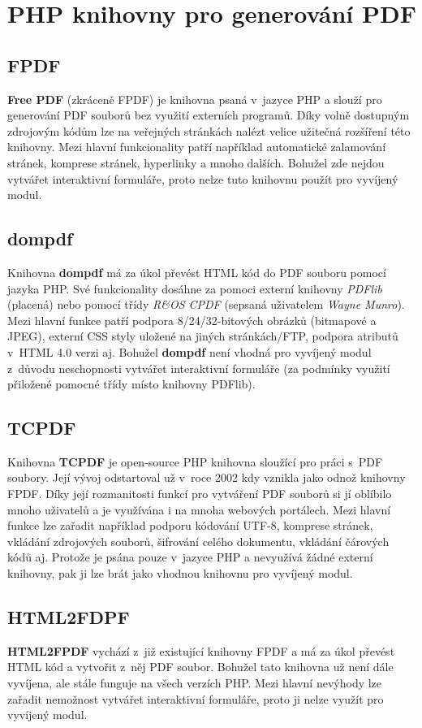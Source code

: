 \section{PHP knihovny pro generování PDF}
\subsection{FPDF}
\textbf{Free PDF} (zkráceně FPDF) je knihovna psaná v~jazyce PHP a slouží pro generování PDF souborů bez využití externích programů. Díky volně dostupným zdrojovým kódům lze na veřejných stránkách nalézt velice užitečná rozšíření této knihovny. Mezi hlavní funkcionality patří například automatické zalamování stránek, komprese stránek, hyperlinky a mnoho dalších. Bohužel zde nejdou vytvářet interaktivní formuláře, proto nelze tuto knihovnu použít pro vyvíjený modul.
\subsection{dompdf}
Knihovna \textbf{dompdf} má za úkol převést HTML kód do PDF souboru pomocí jazyka PHP. Své funkcionality dosáhne za pomoci externí knihovny \textit{PDFlib} (placená) nebo pomocí třídy \textit{R\&OS CPDF} (sepsaná uživatelem \textit{Wayne Munro}). Mezi hlavní funkce patří podpora 8/24/32-bitových obrázků (bitmapové a JPEG), externí CSS styly uložené na jiných stránkách/FTP, podpora atributů v~HTML 4.0 verzi aj. Bohužel \textbf{dompdf} není vhodná pro vyvíjený modul z~důvodu neschopnosti vytvářet interaktivní formuláře (za podmínky využití přiložené pomocné třídy místo knihovny PDFlib).
\subsection{TCPDF} \label{subsec:tcpdf}
Knihovna \textbf{TCPDF} je open-source PHP knihovna sloužící pro práci s~PDF soubory. Její vývoj odstartoval už v~roce 2002 kdy vznikla jako odnož knihovny FPDF. Díky její rozmanitosti funkcí pro vytváření PDF souborů si jí oblíbilo mnoho uživatelů a je využívána i na mnoha webových portálech. Mezi hlavní funkce lze zařadit například podporu kódování UTF-8, komprese stránek, vkládání zdrojových souborů, šifrování celého dokumentu, vkládání čárových kódů  aj. Protože je psána pouze v~jazyce PHP a nevyužívá žádné externí knihovny, pak ji lze brát jako vhodnou knihovnu pro vyvíjený modul.
\subsection{HTML2FDPF}
\textbf{HTML2FPDF} vychází z~již existující knihovny FPDF a má za úkol převést HTML kód a vytvořit z~něj PDF soubor. Bohužel tato knihovna už není dále vyvíjena, ale stále funguje na všech verzích PHP. Mezi hlavní nevýhody lze zařadit nemožnost vytvářet interaktivní formuláře, proto ji nelze využít pro vyvíjený modul.
